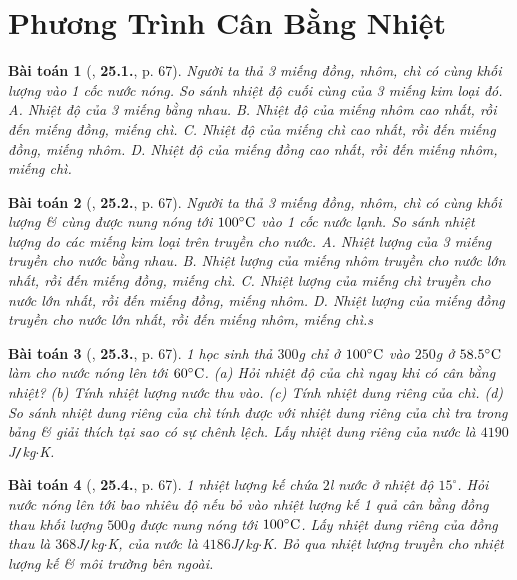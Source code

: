 \documentclass{article}
\numberwithin{equation}{section}
\newtheorem{baitoan}{Bài toán}
\begin{document}

\section{Phương Trình Cân Bằng Nhiệt}

\begin{baitoan}[\cite{SBT_Vat_Ly_8}, \textbf{25.1.}, p. 67]
	Người ta thả 3 miếng đồng, nhôm, chì có cùng khối lượng vào 1 cốc nước nóng. So sánh nhiệt độ cuối cùng của 3 miếng kim loại đó. {\sf A.} Nhiệt độ của 3 miếng bằng nhau. {\sf B.} Nhiệt độ của miếng nhôm cao nhất, rồi đến miếng đồng, miếng chì. {\sf C.} Nhiệt độ của miếng chì cao nhất, rồi đến miếng đồng, miếng nhôm. {\sf D.} Nhiệt độ của miếng đồng cao nhất, rồi đến miếng nhôm, miếng chì.
\end{baitoan}

\begin{baitoan}[\cite{SBT_Vat_Ly_8}, \textbf{25.2.}, p. 67]
	Người ta thả 3 miếng đồng, nhôm, chì có cùng khối lượng \& cùng được nung nóng tới $100^\circ{\rm C}$ vào 1 cốc nước lạnh. So sánh nhiệt lượng do các miếng kim loại trên truyền cho nước. {\sf A.} Nhiệt lượng của 3 miếng truyền cho nước bằng nhau. {\sf B.} Nhiệt lượng của miếng nhôm truyền cho nước lớn nhất, rồi đến miếng đồng, miếng chì. {\sf C.} Nhiệt lượng của miếng chì truyền cho nước lớn nhất, rồi đến miếng đồng, miếng nhôm. {\sf D.} Nhiệt lượng của miếng đồng truyền cho nước lớn nhất, rồi đến miếng nhôm, miếng chì.s
\end{baitoan}

\begin{baitoan}[\cite{SBT_Vat_Ly_8}, \textbf{25.3.}, p. 67]
	1 học sinh thả $300$\emph{g} chỉ ở $100^\circ{\rm C}$ vào $250$\emph{g} ở $58.5^\circ{\rm C}$ làm cho nước nóng lên tới $60^\circ{\rm C}$. (a) Hỏi nhiệt độ của chì ngay khi có cân bằng nhiệt? (b) Tính nhiệt lượng nước thu vào. (c) Tính nhiệt dung riêng của chì. (d) So sánh nhiệt dung riêng của chì tính được với nhiệt dung riêng của chì tra trong bảng \& giải thích tại sao có sự chênh lệch. Lấy nhiệt dung riêng của nước là $4190$\emph{J\texttt{/}kg$\cdot$K}.
\end{baitoan}

\begin{baitoan}[\cite{SBT_Vat_Ly_8}, \textbf{25.4.}, p. 67]
	1 nhiệt lượng kế chứa $2$\emph{l} nước ở nhiệt độ $15^\circ$. Hỏi nước nóng lên tới bao nhiêu độ nếu bỏ vào nhiệt lượng kế 1 quả cân bằng đồng thau khối lượng $500$\emph{g} được nung nóng tới $100^\circ{\rm C}$. Lấy nhiệt dung riêng của đồng thau là $368$\emph{J\texttt{/}kg$\cdot$K}, của nước là $4186$\emph{J\texttt{/}kg$\cdot$K}. Bỏ qua nhiệt lượng truyền cho nhiệt lượng kế \& môi trường bên ngoài.
\end{baitoan}
\end{document}
